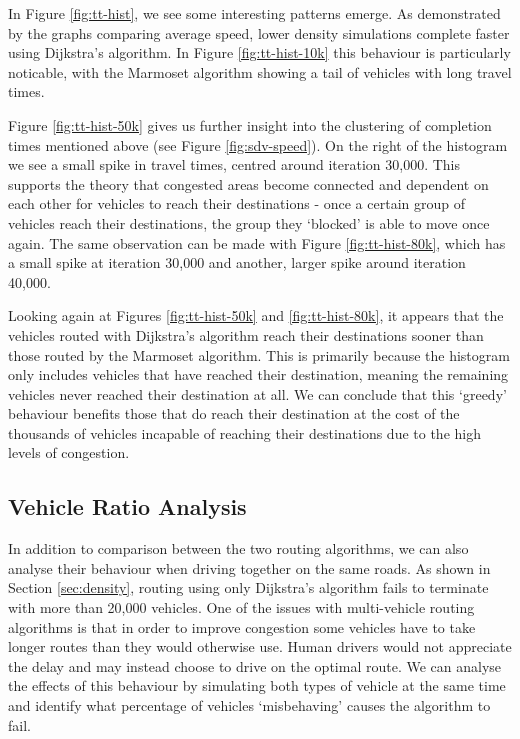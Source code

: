 \documentclass[ %
                    author={Alexander Hill},
                supervisor={Dr. Benjamin Sach},
                    degree={MEng},
                     title={MARMOSET},
                  subtitle={Multi-Agent Route Management using Online Simulation for Efficient Transportation},
                      type={research},
                      year={2016} ]{dissertation}
\begin{document}
In Figure \ref{fig:tt-hist}, we see some interesting patterns emerge. As
demonstrated by the graphs comparing average speed, lower density simulations
complete faster using Dijkstra's algorithm. In Figure \ref{fig:tt-hist-10k}
this behaviour is particularly noticable, with the Marmoset algorithm showing a
tail of vehicles with long travel times.

Figure \ref{fig:tt-hist-50k} gives us further insight into the clustering of
completion times mentioned above (see Figure \ref{fig:sdv-speed}). On the
right of the histogram we see a small spike in travel times, centred around
iteration 30,000. This supports the theory that congested areas become
connected and dependent on each other for vehicles to reach their destinations -
once a certain group of vehicles reach their destinations, the group they
`blocked' is able to move once again. The same observation can be made with
Figure \ref{fig:tt-hist-80k}, which has a small spike at iteration 30,000 and
another, larger spike around iteration 40,000.

Looking again at Figures \ref{fig:tt-hist-50k} and \ref{fig:tt-hist-80k}, it
appears that the vehicles routed with Dijkstra's algorithm reach their
destinations sooner than those routed by the Marmoset algorithm. This is
primarily because the histogram only includes vehicles that have reached their
destination, meaning the remaining vehicles never reached their destination at
all. We can conclude that this `greedy' behaviour benefits those that do
reach their destination at the cost of the thousands of vehicles incapable of
reaching their destinations due to the high levels of congestion.

\subsection{Vehicle Ratio Analysis}\label{sec:ratio}

In addition to comparison between the two routing algorithms, we can also
analyse their behaviour when driving together on the same roads. As shown in
Section \ref{sec:density}, routing using only Dijkstra's algorithm fails to
terminate with more than 20,000 vehicles. One of the issues with multi-vehicle
routing algorithms is that in order to improve congestion some vehicles have to
take longer routes than they would otherwise use. Human drivers would not
appreciate the delay and may instead choose to drive on the optimal route. We
can analyse the effects of this behaviour by simulating both types of vehicle at
the same time and identify what percentage of vehicles `misbehaving' causes the
algorithm to fail.
\end{document}
